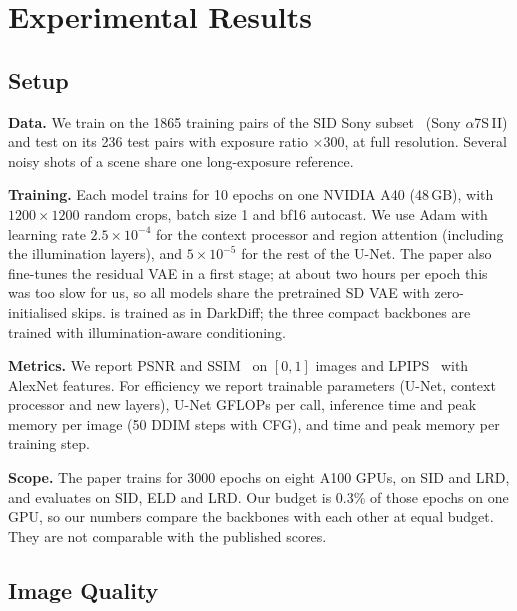 \section{Experimental Results}
\label{sec:experiments}

\subsection{Setup}
\label{sec:setup}

\textbf{Data.}
We train on the 1865 training pairs of the SID Sony subset~\cite{chen2018sid} (Sony
$\alpha$7S\,II) and test on its 236 test pairs with exposure ratio $\times300$, at full
resolution. Several noisy shots of a scene share one long-exposure reference.

\textbf{Training.}
Each model trains for 10 epochs on one NVIDIA A40 (48\,GB), with $1200\times1200$ random crops,
batch size 1 and bf16 autocast. We use Adam with learning rate $2.5\times10^{-4}$ for the context
processor and region attention (including the illumination layers), and $5\times10^{-5}$ for the
rest of the U-Net. The paper also fine-tunes the residual VAE in a first stage; at about two hours
per epoch this was too slow for us, so all models share the pretrained SD VAE with zero-initialised
skips. \sdtwo{} is trained as in DarkDiff; the three compact backbones are trained with
illumination-aware conditioning.

\textbf{Metrics.}
We report PSNR and SSIM~\cite{wang2004ssim} on $[0,1]$ images and LPIPS~\cite{zhang2018lpips}
with AlexNet features. For efficiency we report trainable parameters (U-Net, context processor
and new layers), U-Net GFLOPs per call, inference time and peak memory per image (50 DDIM steps
with CFG), and time and peak memory per training step.

\textbf{Scope.}
The paper trains for 3000 epochs on eight A100 GPUs, on SID and LRD, and evaluates on SID, ELD
and LRD. Our budget is 0.3\% of those epochs on one GPU, so our numbers compare the backbones with
each other at equal budget. They are not comparable with the published scores.

\subsection{Image Quality}
\label{sec:quality}

